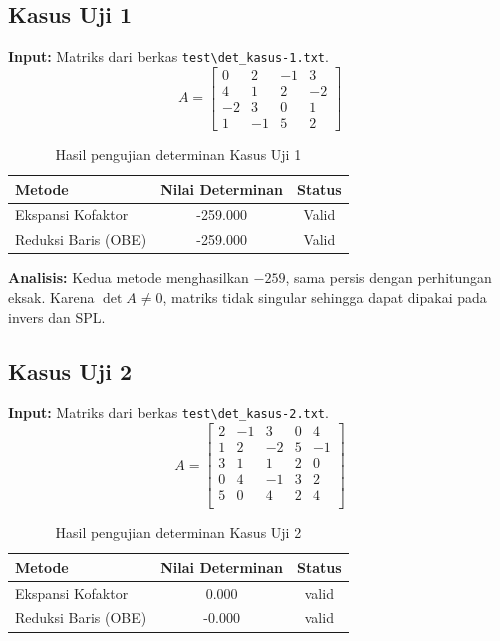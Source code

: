 \documentclass[12pt,a4paper]{report}
\begin{document}
\subsection{Kasus Uji 1}
\textbf{Input:} Matriks dari berkas \texttt{test\textbackslash det\_kasus-1.txt}.
\[
A = \begin{bmatrix}
     0 &  2 &  -1 & 3 \\
    4 & 1 & 2 & -2 \\
    -2 & 3 & 0 & 1 \\
    1 & -1 & 5 & 2
\end{bmatrix}
\]
 
\begin{table}[H]
    \centering
    \caption{Hasil pengujian determinan Kasus Uji 1}
    \begin{tabular}{|l|c|c|}
        \hline
        \textbf{Metode} & \textbf{Nilai Determinan} & \textbf{Status} \\
        \hline
        Ekspansi Kofaktor & -259.000 & Valid \\
        Reduksi Baris (OBE) & -259.000 & Valid \\
        \hline
    \end{tabular}
\end{table}
 
\textbf{Analisis:}  Kedua metode menghasilkan $-259$, sama persis dengan perhitungan eksak. Karena $\det A \neq 0$, matriks tidak singular sehingga dapat dipakai pada invers dan SPL. 

\subsection{Kasus Uji 2}
\textbf{Input:} Matriks dari berkas \texttt{test\textbackslash det\_kasus-2.txt}.
\[
A = \begin{bmatrix}
    2 &-1&3 &0 &4 \\
    1 &2 &-2 &5 &-1 \\ 
    3 &1 &1 &2 &0 \\ 
    0 &4 &-1 &3 &2 \\ 
    5 &0 &4 &2 &4 \\ 
\end{bmatrix}
\]
 
\begin{table}[H]
    \centering
    \caption{Hasil pengujian determinan Kasus Uji 2}
    \begin{tabular}{|l|c|c|}
        \hline 

        \textbf{Metode} & \textbf{Nilai Determinan} & \textbf{Status} \\
        \hline
        Ekspansi Kofaktor & 0.000 & valid \\
        Reduksi Baris (OBE) & -0.000 & valid \\
        \hline
    \end{tabular}
\end{table}
 
\end{document}
